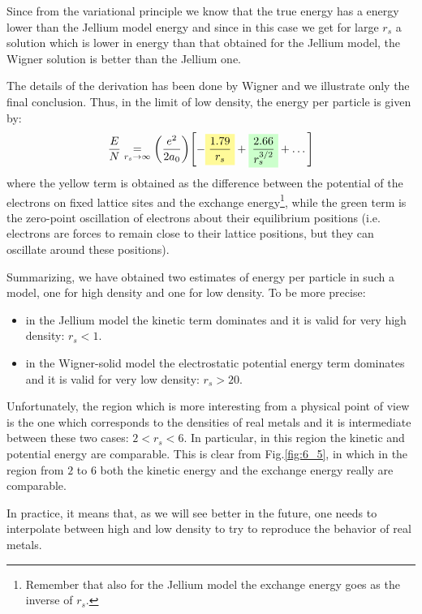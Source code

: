 \documentclass[../main/main.tex]{subfiles}
\begin{document}
\begin{remark}
Since from the variational principle we know that the true energy has a energy lower than the Jellium model energy and since in this case we get for large \( r_s \) a solution which is lower in energy than that obtained for the Jellium model, the Wigner solution is better than the Jellium one.
\end{remark}

The details of the derivation has been done by Wigner and we illustrate only the final conclusion. Thus, in the limit of low density, the energy per particle is given by:
\begin{equation*}
  \frac{E}{N} \underset{r_s \rightarrow \infty }{=} \qty(\frac{e^2}{2 a_0}) \qty[-\mathcolorbox{yellow!40}{\frac{1.79}{r_s}} + \mathcolorbox{green!20}{\frac{2.66}{r_s^{3/2}}} + \dots]
\end{equation*}
where the yellow term is obtained as the difference between the potential of the electrons on fixed lattice sites and the exchange energy\footnote{Remember that also for the Jellium model the exchange energy goes as the inverse of \( r_s \).}, while the green term is the zero-point oscillation of electrons about their equilibrium positions (i.e. electrons are forces to remain close to their lattice positions, but they can oscillate around these positions).

Summarizing, we have obtained two estimates of energy per particle in such a model, one for high density and one for low density. To be more precise:
\begin{itemize}
\item in the Jellium model the kinetic term dominates and it is valid for very high density: \( r_s <1 \).

\item in the Wigner-solid model the electrostatic potential energy term dominates and it is valid for very low density: \( r_s > 20 \).
\end{itemize}

Unfortunately, the region which is more interesting from a physical point of view is the one which corresponds to the densities of real metals and it is intermediate between these two cases: \( 2 < r_s < 6 \). In particular, in this region the kinetic and potential energy are comparable. This is clear from Fig.\ref{fig:6_5}, in which in the region from \( 2 \) to \( 6 \) both the kinetic energy and the exchange energy really are comparable.

In practice, it means that, as we will see better in the future, one needs to interpolate between high and low density to try to reproduce the behavior of real metals.
\end{document}
